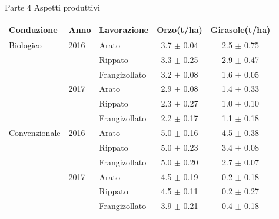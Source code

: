 \documentclass[10pt]{beamer}
\begin{document}
\begin{frame}{Parte 4 \small{Aspetti produttivi}}

  \vspace{0.5cm}
  \footnotesize{
    \begin{table}[ht]
      \centering
      \begin{tabular}{lllcc}
        \hline
        Conduzione   & Anno & Lavorazione   & Orzo(t/ha)      & Girasole(t/ha) \\ 
        \hline
        Biologico    & 2016 & Arato         & 3.7 $\pm$ 0.04  & 2.5 $\pm$ 0.75 \\ 
                     &      & Rippato       & 3.3 $\pm$ 0.25  & 2.9 $\pm$ 0.47 \\ 
                     &      & Frangizollato & 3.2 $\pm$ 0.08  & 1.6 $\pm$ 0.05 \\ 
                     & 2017 & Arato         & 2.9 $\pm$ 0.08  & 1.4 $\pm$ 0.33 \\ 
                     &      & Rippato       & 2.3 $\pm$ 0.27  & 1.0 $\pm$ 0.10 \\ 
                     &      & Frangizollato & 2.2 $\pm$ 0.17  & 1.1 $\pm$ 0.18 \\ 
        Convenzionale& 2016 & Arato         & 5.0 $\pm$ 0.16  & 4.5 $\pm$ 0.38 \\ 
                     &      & Rippato       & 5.0 $\pm$ 0.23  & 3.4 $\pm$ 0.08 \\ 
                     &      & Frangizollato & 5.0 $\pm$ 0.20  & 2.7 $\pm$ 0.07 \\ 
                     & 2017 & Arato         & 4.5 $\pm$ 0.19  & 0.2 $\pm$ 0.18 \\ 
                     &      & Rippato       & 4.5 $\pm$ 0.11  & 0.2 $\pm$ 0.27 \\ 
                     &      & Frangizollato & 3.9 $\pm$ 0.21  & 0.4 $\pm$ 0.18 \\ 
        \hline
      \end{tabular}
    \end{table}}



\end{frame}



\begin{frame}
\end{frame}

\appendix

\end{document}
